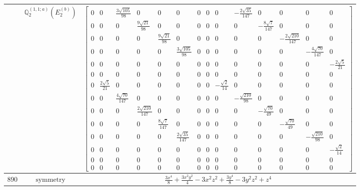 \documentclass[fleqn,8pt,landscape]{jsarticle}
\begin{document}
\begin{longtable}{ccc}
$  $ & $ \mathbb{Q}_{2}^{(1,1;a)}(E_{2}^{(b)}) $ & $ \begin{bmatrix} 0 & 0 & \frac{3 \sqrt{105}}{98} & 0 & 0 & 0 & 0 & 0 & 0 & - \frac{2 \sqrt{35}}{147} & 0 & 0 & 0 & 0 \\ 0 & 0 & 0 & \frac{9 \sqrt{21}}{98} & 0 & 0 & 0 & 0 & 0 & 0 & - \frac{8 \sqrt{7}}{147} & 0 & 0 & 0 \\ 0 & 0 & 0 & 0 & \frac{9 \sqrt{21}}{98} & 0 & 0 & 0 & 0 & 0 & 0 & - \frac{2 \sqrt{210}}{147} & 0 & 0 \\ 0 & 0 & 0 & 0 & 0 & \frac{3 \sqrt{105}}{98} & 0 & 0 & 0 & 0 & 0 & 0 & - \frac{4 \sqrt{70}}{147} & 0 \\ 0 & 0 & 0 & 0 & 0 & 0 & 0 & 0 & 0 & 0 & 0 & 0 & 0 & - \frac{2 \sqrt{5}}{21} \\ 0 & 0 & 0 & 0 & 0 & 0 & 0 & 0 & 0 & 0 & 0 & 0 & 0 & 0 \\ 0 & \frac{2 \sqrt{5}}{21} & 0 & 0 & 0 & 0 & 0 & 0 & - \frac{\sqrt{2}}{14} & 0 & 0 & 0 & 0 & 0 \\ 0 & 0 & \frac{4 \sqrt{70}}{147} & 0 & 0 & 0 & 0 & 0 & 0 & - \frac{\sqrt{210}}{98} & 0 & 0 & 0 & 0 \\ 0 & 0 & 0 & \frac{2 \sqrt{210}}{147} & 0 & 0 & 0 & 0 & 0 & 0 & - \frac{\sqrt{70}}{49} & 0 & 0 & 0 \\ 0 & 0 & 0 & 0 & \frac{8 \sqrt{7}}{147} & 0 & 0 & 0 & 0 & 0 & 0 & - \frac{\sqrt{70}}{49} & 0 & 0 \\ 0 & 0 & 0 & 0 & 0 & \frac{2 \sqrt{35}}{147} & 0 & 0 & 0 & 0 & 0 & 0 & - \frac{\sqrt{210}}{98} & 0 \\ 0 & 0 & 0 & 0 & 0 & 0 & 0 & 0 & 0 & 0 & 0 & 0 & 0 & - \frac{\sqrt{2}}{14} \\ 0 & 0 & 0 & 0 & 0 & 0 & 0 & 0 & 0 & 0 & 0 & 0 & 0 & 0 \\ 0 & 0 & 0 & 0 & 0 & 0 & 0 & 0 & 0 & 0 & 0 & 0 & 0 & 0 \end{bmatrix} $ \\ \hline
$ 890 $ & $ \text{symmetry} $ & $ \frac{3 x^{4}}{8} + \frac{3 x^{2} y^{2}}{4} - 3 x^{2} z^{2} + \frac{3 y^{4}}{8} - 3 y^{2} z^{2} + z^{4} $ \\

\end{longtable}
\end{document}
